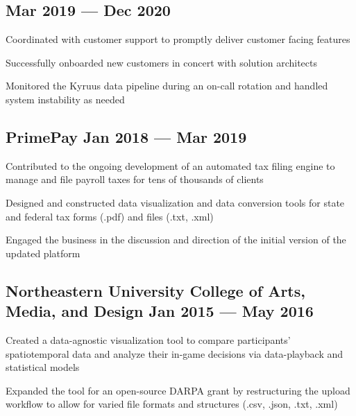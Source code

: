 \subsection{{\hfill Mar 2019 --- Dec 2020}}
\begin{zitemize}
\item Coordinated with customer support to promptly deliver customer facing features
\item Successfully onboarded new customers in concert with solution architects
\item Monitored the Kyruus data pipeline during an on-call rotation and handled system instability as needed
\end{zitemize}

\subsection{{PrimePay \hfill Jan 2018 --- Mar 2019}}
\begin{zitemize}
\item Contributed to the ongoing development of an automated tax filing engine to manage and file payroll taxes for tens of thousands of clients
\item Designed and constructed data visualization and data conversion tools for state and federal tax forms (.pdf) and files (.txt, .xml)
\item Engaged the business in the discussion and direction of the initial version of the updated platform
\end{zitemize}

\subsection{{Northeastern University College of Arts, Media, and Design \hfill Jan 2015 --- May 2016}}
\begin{zitemize}
\item Created a data-agnostic visualization tool to compare participants' spatiotemporal data and analyze their in-game decisions via data-playback and statistical models
\item Expanded the tool for an open-source DARPA grant by restructuring the upload workflow to allow for varied file formats and structures (.csv, .json, .txt, .xml)
\end{zitemize}


